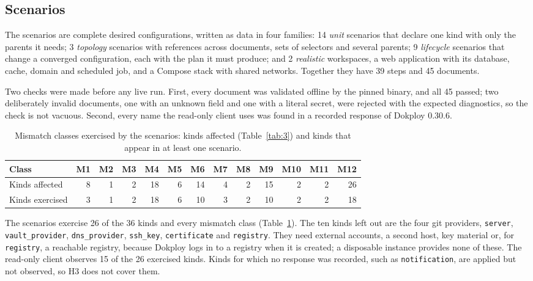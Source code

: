 \subsection{Scenarios}\label{sec:9.2}

The scenarios are complete desired configurations, written as data in four families: 14 \emph{unit}
scenarios that declare one kind with only the parents it needs; 3 \emph{topology} scenarios with references
across documents, sets of selectors and several parents; 9 \emph{lifecycle} scenarios that change a
converged configuration, each with the plan it must produce; and 2 \emph{realistic} workspaces, a web
application with its database, cache, domain and scheduled job, and a Compose stack with shared
networks. Together they have 39 steps and 45 documents.

Two checks were made before any live run. First, every document was validated offline by the pinned
binary, and all 45 passed; two deliberately invalid documents, one with an unknown field and one with
a literal secret, were rejected with the expected diagnostics, so the check is not vacuous. Second,
every name the read-only client uses was found in a recorded response of Dokploy 0.30.6.

\begin{table}[tbp]
\centering
\small
\caption{Mismatch classes exercised by the scenarios: kinds affected
(Table~\ref{tab:3}) and kinds that appear in at least one scenario.}
\label{tab:15}
\begin{tabular}{lrrrrrrrrrrrr}
\toprule
Class & M1 & M2 & M3 & M4 & M5 & M6 & M7 & M8 & M9 & M10 & M11 & M12 \\
\midrule
Kinds affected & 8 & 1 & 2 & 18 & 6 & 14 & 4 & 2 & 15 & 2 & 2 & 26 \\
Kinds exercised & 3 & 1 & 2 & 18 & 6 & 10 & 3 & 2 & 10 & 2 & 2 & 18 \\
\bottomrule
\end{tabular}
\end{table}

The scenarios exercise 26 of the 36 kinds and every mismatch class (Table~\ref{tab:15}). The ten kinds left
out are the four git providers, \texttt{server}, \texttt{vault\_provider}, \texttt{dns\_provider}, \texttt{ssh\_key}, \texttt{certificate}
and \texttt{registry}. They need external accounts, a second host, key material or, for \texttt{registry}, a
reachable registry, because Dokploy logs in to a registry when it is created; a disposable instance
provides none of these. The read-only client observes 15 of the 26 exercised kinds. Kinds for which no
response was recorded, such as \texttt{notification}, are applied but not observed, so H3 does not cover
them.

